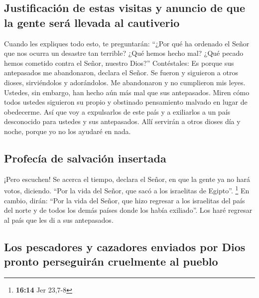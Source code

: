 \hypertarget{justificaciuxf3n-de-estas-visitas-y-anuncio-de-que-la-gente-seruxe1-llevada-al-cautiverio}{%
\subsection{Justificación de estas visitas y anuncio de que la gente
será llevada al
cautiverio}\label{justificaciuxf3n-de-estas-visitas-y-anuncio-de-que-la-gente-seruxe1-llevada-al-cautiverio}}

 Cuando les expliques todo esto, te preguntarán: ``¿Por
qué ha ordenado el Señor que nos ocurra un desastre tan terrible? ¿Qué
hemos hecho mal? ¿Qué pecado hemos cometido contra el Señor, nuestro
Dios?''  Contéstales: Es porque sus antepasados me
abandonaron, declara el Señor. Se fueron y siguieron a otros dioses,
sirviéndolos y adorándolos. Me abandonaron y no cumplieron mis leyes.
 Ustedes, sin embargo, han hecho aún más mal que sus
antepasados. Miren cómo todos ustedes siguieron su propio y obstinado
pensamiento malvado en lugar de obedecerme.  Así que voy
a expulsarlos de este país y a exiliarlos a un país desconocido para
ustedes y sus antepasados. Allí servirán a otros dioses día y noche,
porque yo no los ayudaré en nada.

\hypertarget{profecuxeda-de-salvaciuxf3n-insertada}{%
\subsection{Profecía de salvación
insertada}\label{profecuxeda-de-salvaciuxf3n-insertada}}

 ¡Pero escuchen! Se acerca el tiempo, declara el Señor,
en que la gente ya no hará votos, diciendo. ``Por la vida del Señor, que
sacó a los israelitas de Egipto''. \footnote{\textbf{16:14} Jer 23,7-8}
 En cambio, dirán: ``Por la vida del Señor, que hizo
regresar a los israelitas del país del norte y de todos los demás países
donde los había exiliado''. Los haré regresar al país que les di a sus
antepasados.

\hypertarget{los-pescadores-y-cazadores-enviados-por-dios-pronto-perseguiruxe1n-cruelmente-al-pueblo}{%
\subsection{Los pescadores y cazadores enviados por Dios pronto
perseguirán cruelmente al
pueblo}\label{los-pescadores-y-cazadores-enviados-por-dios-pronto-perseguiruxe1n-cruelmente-al-pueblo}}

